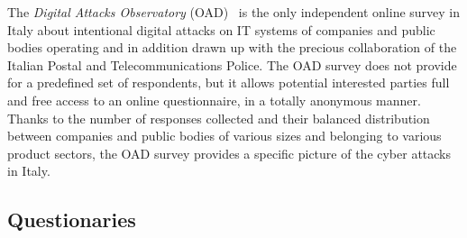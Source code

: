 \documentclass{easychair}
\begin{document}
The \textit{Digital Attacks Observatory} (OAD)~\cite{oadweb} is the only independent online survey in Italy about intentional digital attacks on IT systems of companies and public
bodies operating and in addition drawn up with the precious collaboration of the Italian Postal and Telecommunications Police. The OAD survey does not provide 
for a predefined set of respondents, but it allows potential interested parties full and free access to an online questionnaire, in a totally anonymous manner. 
Thanks to the number of responses collected and their balanced distribution between companies and public bodies of various sizes and belonging to various product 
sectors, the OAD survey provides a specific picture of the cyber attacks in Italy.

\subsection{Questionaries}
\end{document}
